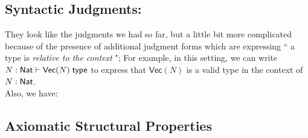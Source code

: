 \documentclass{article}
\begin{document}
\subsection{ Syntactic Judgments:}

They look like the judgments we had so far, but a little bit more complicated because of the presence of additional judgment forms which are expressing `` a type is {\it relative to the context} "; For example, in this setting, we can write $\hasTF{N : \tNat}{\mathsf{Vec}(N)}$ to express that $\mathsf{Vec}(N)$ is a valid type in the context of $N : \mathsf{Nat}$.\\
Also, we have:
\subsection{Axiomatic Structural Properties}  
\end{document}
